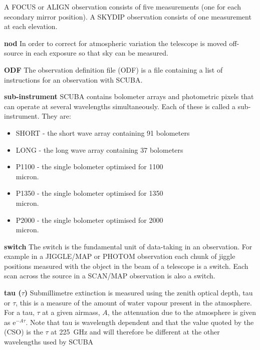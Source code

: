 \documentclass[twoside,11pt,nolof]{starlink}
\begin{document}
\begin{description}
A FOCUS or ALIGN observation consists of five measurements (one for each
secondary mirror position). A SKYDIP observation consists of one measurement
at each elevation.

\item{\textbf{nod}} In order to correct for atmospheric variation the telescope
is moved off-source in each exposure so that sky can be measured.

\item{\textbf{ODF}} The observation definition file (ODF) is a file containing a
list of instructions for an observation with SCUBA.

\item{\textbf{sub-instrument}} SCUBA contains bolometer arrays and photometric
pixels that can operate at several wavelengths simultaneously. Each of these
is called a sub-instrument. They are:

\begin{itemize}
\item SHORT - the short wave array containing 91 bolometers
\item LONG - the long wave array containing 37 bolometers
\item P1100 - the single bolometer optimised for 1100\\micron.
\item P1350 - the single bolometer optimised for 1350\\micron.
\item P2000 - the single bolometer optimised for 2000\\micron.
\end{itemize}


\item{\textbf{switch}} The switch is the fundamental unit of data-taking in an
observation. For example in a JIGGLE/MAP or PHOTOM observation each chunk of
jiggle positions measured with the object in the beam of a telescope is a
switch. Each scan across the source in a SCAN/MAP observation is also a switch.

\item{\textbf{tau ($\tau$)}} Submillimetre extinction is measured using the
zenith optical depth, tau or $\tau$, this is a measure of the amount of water
vapour present in the atmosphere. For a tau, $\tau$ at a given airmass, $A$,
the attenuation due to the atmosphere is given as e$^{-A \tau}$. Note that tau
is wavelength dependent and that the value quoted by the
 (CSO) is the $\tau$ at 225~GHz and will therefore be different at
the other wavelengths used by SCUBA

\end{description}
\end{document}
